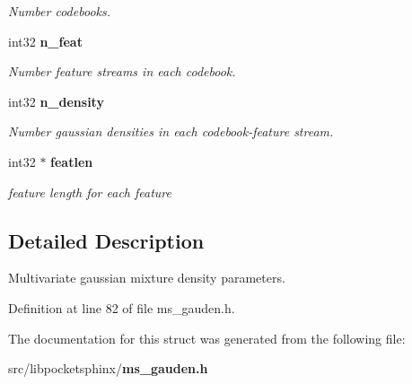 \begin{DoxyCompactItemize}
\begin{DoxyCompactList}\small\item\em Number codebooks. \end{DoxyCompactList}\item 
int32 {\bf n\+\_\+feat}\label{structgauden__t_a6dea221962b4a278dbae4806925a7be0}

\begin{DoxyCompactList}\small\item\em Number feature streams in each codebook. \end{DoxyCompactList}\item 
int32 {\bf n\+\_\+density}\label{structgauden__t_ab5104d8fa59bc94b12b36104dd4c19ac}

\begin{DoxyCompactList}\small\item\em Number gaussian densities in each codebook-\/feature stream. \end{DoxyCompactList}\item 
int32 $\ast$ {\bf featlen}\label{structgauden__t_aca099d830de926e628ac0b523046b32c}

\begin{DoxyCompactList}\small\item\em feature length for each feature \end{DoxyCompactList}\end{DoxyCompactItemize}


\subsection{Detailed Description}
Multivariate gaussian mixture density parameters. 

Definition at line 82 of file ms\+\_\+gauden.\+h.



The documentation for this struct was generated from the following file\+:\begin{DoxyCompactItemize}
\item 
src/libpocketsphinx/{\bf ms\+\_\+gauden.\+h}\end{DoxyCompactItemize}
